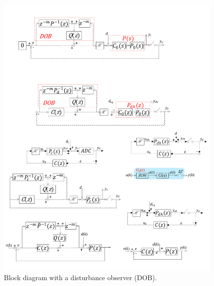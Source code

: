 \documentclass [11pt, proquest] {uwthesis}[2020/02/24]
\begin{document}
\begin{figure}[!ht]
\begin{centering}
\includegraphics[width=13cm]{Spectral-analysis/FIG15.pdf}
\par\end{centering}
\caption{\label{fig:Block-diagram-with}Block diagram with a disturbance observer
(DOB).}
\end{figure}
 
\end{document}
